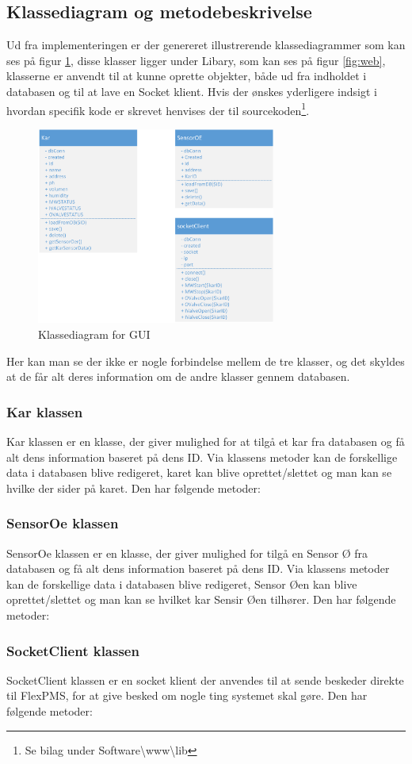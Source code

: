 \subsection{Klassediagram og metodebeskrivelse}
Ud fra implementeringen er der genereret illustrerende klassediagrammer som kan ses på figur \ref{fig:GUI_KD}, disse klasser ligger under Libary, som kan ses på figur \ref{fig:web}, klasserne er anvendt til at kunne oprette objekter, både ud fra indholdet i databasen og til at lave en Socket klient. Hvis der ønskes yderligere indsigt i hvordan specifik kode er skrevet henvises der til sourcekoden\footnote{Se bilag under Software\textbackslash www\textbackslash lib}.

\begin{figure}[H]
    \centering
    \includegraphics[width=0.7\textwidth]{SoftwareArkitektur/GUI/KlasseDiagram/photo/klasseDiagram_gui.PNG}
    \caption{Klassediagram for GUI}
    \label{fig:GUI_KD}
\end{figure}

Her kan man se der ikke er nogle forbindelse mellem de tre klasser, og det skyldes at de får alt deres information om de andre klasser gennem databasen.
 
\subsubsection{Kar klassen}
Kar klassen er en klasse, der giver mulighed for at tilgå et kar fra databasen og få alt dens information baseret på dens ID. Via klassens metoder kan de forskellige data i databasen blive redigeret, karet kan blive oprettet/slettet og man kan se hvilke  der sider på karet. Den har følgende metoder:

\subsubsection{SensorOe klassen}
SensorOe klassen er en klasse, der giver mulighed for tilgå en Sensor Ø fra databasen og få alt dens information baseret på dens ID. Via klassens metoder kan de forskellige data i databasen blive redigeret, Sensor Øen kan blive oprettet/slettet og man kan se hvilket kar Sensir Øen tilhører. Den har følgende metoder:

\subsubsection{SocketClient klassen}
SocketClient klassen er en socket klient der anvendes til at sende beskeder direkte til FlexPMS, for at give besked om nogle ting systemet skal gøre. Den har følgende metoder: